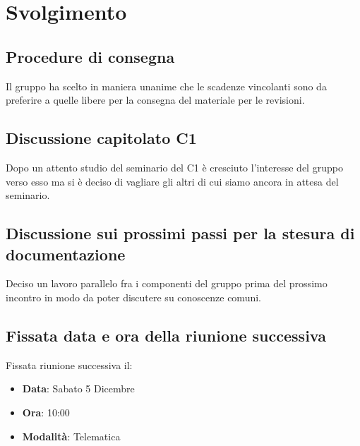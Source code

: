 \documentclass[]{article}
\begin{document}
	\newpage
	
	\section{Svolgimento}
		\subsection{Procedure di consegna}
		Il gruppo ha scelto in maniera unanime che le scadenze vincolanti sono da preferire a quelle libere per la consegna del materiale per le revisioni.\\
		
		\subsection{Discussione capitolato C1}
		Dopo un attento studio del seminario del  C1 è cresciuto l'interesse del gruppo verso esso ma si è deciso di vagliare gli altri  di cui siamo ancora in attesa del seminario. 
		
		\subsection{Discussione sui prossimi passi per la stesura di documentazione}
		Deciso un lavoro parallelo fra i componenti del gruppo prima del
		prossimo incontro in modo da poter discutere su conoscenze comuni.\\
		
		\subsection{Fissata data e ora della riunione successiva}
		Fissata riunione successiva il:
		\begin{itemize}
			\item \textbf{Data}: Sabato 5 Dicembre
			\item \textbf{Ora}: 10:00
			\item \textbf{Modalità}: Telematica
		\end{itemize}	
	
\end{document}
